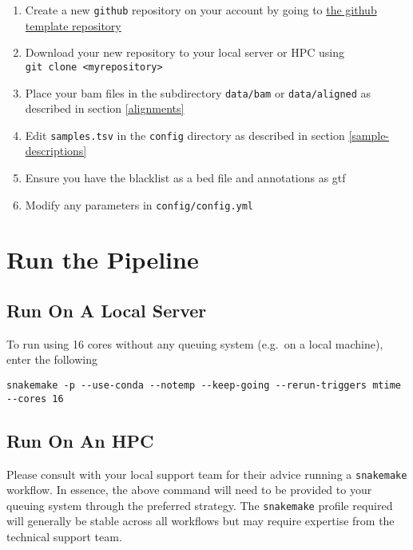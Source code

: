 \documentclass[
]{book}
\providecommand{\tightlist}{%
  \setlength{\itemsep}{0pt}\setlength{\parskip}{0pt}}
\begin{document}
\begin{enumerate}
\def\labelenumi{\arabic{enumi}.}
\tightlist
\item
  Create a new \texttt{github} repository on your account by going to \href{https://github.com/smped/GRAVI/generate}{the github template repository}
\item
  Download your new repository to your local server or HPC using \texttt{git\ clone\ \textless{}myrepository\textgreater{}}
\item
  Place your bam files in the subdirectory \texttt{data/bam} or \texttt{data/aligned} as described in section \ref{alignments}
\item
  Edit \texttt{samples.tsv} in the \texttt{config} directory as described in section \ref{sample-descriptions}
\item
  Ensure you have the blacklist as a bed file and annotations as gtf
\item
  Modify any parameters in \texttt{config/config.yml}
\end{enumerate}

\hypertarget{quick-run}{%
\section{Run the Pipeline}\label{quick-run}}

\hypertarget{run-on-a-local-server}{%
\subsection{Run On A Local Server}\label{run-on-a-local-server}}

To run using 16 cores without any queuing system (e.g.~on a local machine), enter the following

\begin{verbatim}
snakemake -p --use-conda --notemp --keep-going --rerun-triggers mtime --cores 16
\end{verbatim}

\hypertarget{run-on-an-hpc}{%
\subsection{Run On An HPC}\label{run-on-an-hpc}}

Please consult with your local support team for their advice running a \texttt{snakemake} workflow.
In essence, the above command will need to be provided to your queuing system through the preferred strategy.
The \texttt{snakemake} profile required will generally be stable across all workflows but may require expertise from the technical support team.
\end{document}
